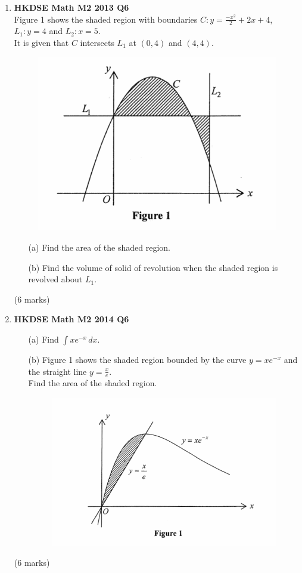 \documentclass{report}
\begin{document}
\begin{enumerate}
	\newpage

	\item \textbf{HKDSE Math M2 2013 Q6}\\
	Figure 1 shows the shaded region with boundaries $C : y = \displaystyle\frac{-x^2}{2} + 2x + 4$, $L_1 : y = 4$ and $L_2 : x = 5$. \\
	It is given that $C$ intersects $L_1$ at $(0,4)$ and $(4,4)$. 
	\begin{figure}[H]
		\centering
		\includegraphics[width = .4\linewidth]{2013Figure1}
	\end{figure}
	\begin{enumerate}
		\item [(a)]Find the area of the shaded region.
		\item [(b)]Find the volume of solid of revolution when the shaded region is revolved about $L_1$.
	\end{enumerate}
	(6 marks)

	\item \textbf{HKDSE Math M2 2014 Q6}
	\begin{enumerate}
		\item [(a)]Find $\displaystyle\int xe^{-x}\,dx$. 
		\item [(b)]Figure 1 shows the shaded region bounded by the curve $y = xe^{-x}$ and the straight line $y = \displaystyle\frac{x}{e}$. \\
		Find the area of the shaded region.
		\begin{figure}[H]
			\centering
			\includegraphics[width = .5\linewidth]{2014Figure1}
		\end{figure}
	\end{enumerate}
	(6 marks)


\end{enumerate}
\end{document}
